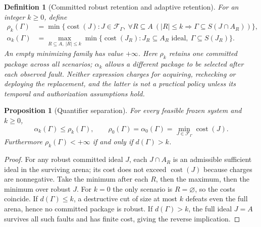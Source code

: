 \documentclass[11pt,letterpaper]{article}
\newtheorem{proposition}[theorem]{Proposition}
\newtheorem{definition}[theorem]{Definition}
\DeclareMathOperator{\cost}{cost}
\newcommand{\Gam}{\Gamma}
\begin{document}
\begin{definition}[Committed robust retention and adaptive retention]\label{def:adapt}
For an integer $k\ge0$, define
\begin{align}
\rho_k(\Gam)&=\min\bigl\{\cost(J):J\in\mathcal F_\Gam,\
  \forall R\subseteq A\ (|R|\le k\Rightarrow \Gam\subseteq S(J\cap A_R))\bigr\},\tag{9}\label{eq:rho}\\
\alpha_k(\Gam)&=\max_{R\subseteq A,\ |R|\le k}
  \min\bigl\{\cost(J_R):J_R\subseteq A_R\text{ ideal},\ \Gam\subseteq S(J_R)\bigr\}.\tag{10}\label{eq:alpha}
\end{align}
An empty minimizing family has value $+\infty$. Here $\rho_k$ retains one \emph{committed} package across all scenarios; $\alpha_k$ allows a different package to be selected \emph{after} each observed fault. Neither expression charges for acquiring, rechecking or deploying the replacement, and the latter is not a practical policy unless its temporal and authorization assumptions hold.
\end{definition}

\begin{proposition}[Quantifier separation]\label{prop:quantifier}
For every feasible frozen system and $k\ge0$,
\[
\alpha_k(\Gam)\le\rho_k(\Gam),\qquad
\rho_0(\Gam)=\alpha_0(\Gam)=\min_{J\in\mathcal F_\Gam}\cost(J).
\tag{11}
\]
Furthermore $\rho_k(\Gam)<+\infty$ if and only if $d(\Gam)>k$.
\end{proposition}
\begin{proof}
For any robust committed ideal $J$, each $J\cap A_R$ is an admissible sufficient ideal in the surviving arena; its cost does not exceed $\cost(J)$ because charges are nonnegative. Take the minimum after each $R$, then the maximum, then the minimum over robust $J$. For $k=0$ the only scenario is $R=\varnothing$, so the costs coincide. If $d(\Gam)\le k$, a destructive cut of size at most $k$ defeats even the full arena, hence no committed package is robust. If $d(\Gam)>k$, the full ideal $J=A$ survives all such faults and has finite cost, giving the reverse implication.
\end{proof}
\end{document}
